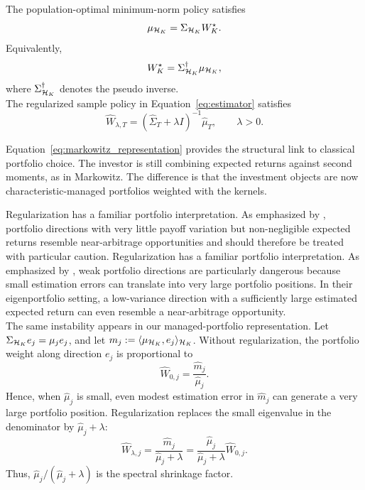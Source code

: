 \begin{proposition}
\label{prop:managed_markowitz}

The population-optimal minimum-norm policy satisfies
\begin{equation}
\mu_{\mathcal{H}_K}
=
\Sigma_{\mathcal{H}_K} W_K^\star.
\label{eq:population_markowitz_representation}
\end{equation}
Equivalently,
\[
W_K^\star
=
\Sigma_{\mathcal{H}_K}^{\dagger}\mu_{\mathcal{H}_K},
\]
where $\Sigma_{\mathcal{H}_K}^{\dagger}$ denotes the pseudo inverse.\\
The regularized sample policy in Equation~\eqref{eq:estimator} satisfies
\begin{equation}
\widehat W_{\lambda,T}
=
\left(
\widehat\Sigma_T+\lambda I
\right)^{-1}
\widehat\mu_T,
\qquad
\lambda>0.
\label{eq:markowitz_representation}
\end{equation}

\end{proposition}

Equation~\eqref{eq:markowitz_representation} provides the structural link to
classical portfolio choice. The investor is still combining expected returns
against second moments, as in Markowitz. The difference is that the investment
objects are now characteristic-managed portfolios weighted with the kernels.

Regularization has a familiar portfolio interpretation. As emphasized by
\citet{kozaknagelsantosh2020}, portfolio directions with very little payoff
variation but non-negligible expected returns resemble near-arbitrage
opportunities and should therefore be treated with particular caution.
Regularization has a familiar portfolio interpretation. As emphasized by
\citet{kozaknagelsantosh2020}, weak portfolio directions are particularly
dangerous because small estimation errors can translate into very large
portfolio positions. In their eigenportfolio setting, a low-variance direction
with a sufficiently large estimated expected return can even resemble a
near-arbitrage opportunity.\\
The same instability appears in our managed-portfolio representation. Let
$\Sigma_{\mathcal{H}_K}e_j=\mu_j e_j$, and let
$m_j:=\langle\mu_{\mathcal{H}_K},e_j\rangle_{\mathcal{H}_K}$.
Without regularization, the portfolio weight along direction $e_j$ is
proportional to
\[
\widehat W_{0,j}
=
\frac{\widehat m_j}{\widehat\mu_j}.
\]
Hence, when $\widehat\mu_j$ is small, even modest estimation error in
$\widehat m_j$ can generate a very large portfolio position. Regularization
replaces the small eigenvalue in the denominator by
$\widehat\mu_j+\lambda$:
\[
\widehat W_{\lambda,j}
=
\frac{\widehat m_j}{\widehat\mu_j+\lambda}
=
\frac{\widehat\mu_j}{\widehat\mu_j+\lambda}
\widehat W_{0,j}.
\]
Thus, $\widehat\mu_j/(\widehat\mu_j+\lambda)$ is the spectral shrinkage factor.



